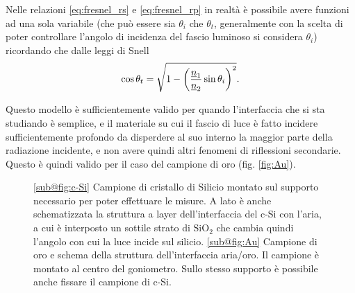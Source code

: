 \documentclass[prb,showpacs,floatfix,altaffilletter,amsmath,amssymb,reprint,citeautoscript,showkeys]{revtex4-1}
\begin{document}
Nelle relazioni \eqref{eq:fresnel_rs} e \eqref{eq:fresnel_rp} in realtà è possibile avere funzioni ad una sola variabile (che può essere sia $\theta_i$ che $\theta_t$, generalmente con la scelta di poter controllare l'angolo di incidenza del fascio luminoso si considera $\theta_i$) ricordando che dalle leggi di Snell \begin{equation}
    \cos\theta_t = \sqrt{1-\qty(\frac{\underline n_1}{\underline n_2}\sin\theta_i)^2}.
    \label{eq:snell}
\end{equation}

Questo modello è sufficientemente valido per quando l'interfaccia che si sta studiando è semplice, e il materiale su cui il fascio di luce è fatto incidere sufficientemente profondo da disperdere al suo interno la maggior parte della radiazione incidente, e non avere quindi altri fenomeni di riflessioni secondarie. Questo è quindi valido per il caso del campione di oro (fig. \ref{fig:Au}).

\begin{figure}
    \centering
    \caption{\ref{sub@fig:c-Si} Campione di  cristallo di Silicio montato sul supporto necessario per poter effettuare le misure. A lato è anche schematizzata la struttura a layer dell'interfaccia del c-Si con l'aria, a cui è interposto un sottile strato di $\mathrm{SiO_2}$ che cambia quindi l'angolo con cui la luce incide sul silicio. \ref{sub@fig:Au} Campione di oro e schema della struttura dell'interfaccia aria/oro. Il campione è montato al centro del goniometro. Sullo stesso supporto è possibile anche fissare il campione di c-Si.}
    \label{fig:c-Si/Au_samples}
\end{figure}
\end{document}
